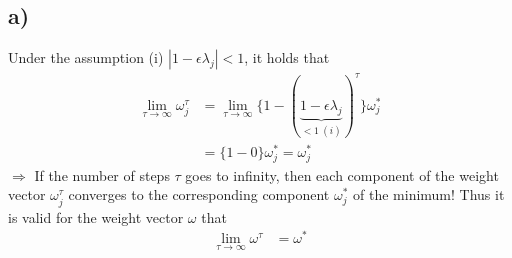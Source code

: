 \documentclass[a4paper]{article}
\begin{document}
    \subsection*{a)}
        Under the assumption (i) $|1-\epsilon\lambda_j| < 1$, it holds that
        \begin{align}
            \lim_{\tau \rightarrow \infty} \omega^{\tau}_j &= \lim_{\tau \rightarrow \infty} \{1 - (\underbrace{1 - \epsilon\lambda_j}_{< 1\ (i)})^{\tau}\} \omega^{*}_j\\
            &= \{1 - 0\} \omega^{*}_j = \omega^{*}_j
        \end{align}
        $\Rightarrow$ If the number of steps $\tau$ goes to infinity, then each component of the weight vector $\omega^{\tau}_j$ converges to the corresponding component $\omega^*_j$ of the minimum! Thus it is valid for the weight vector $\omega$ that 
        \begin{align}
            \lim_{\tau \rightarrow \infty} \omega^{\tau} &= \omega^*
        \end{align}
    
\end{document}
